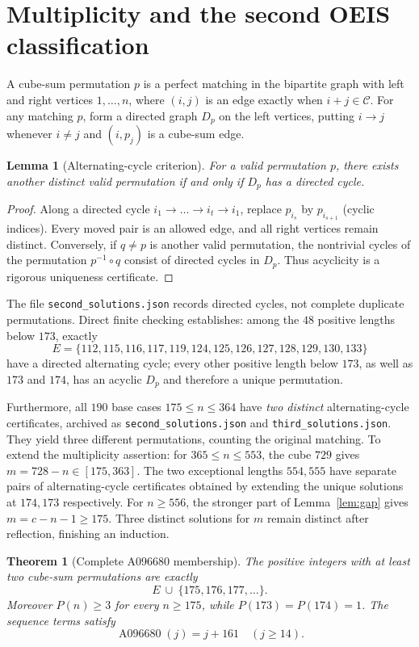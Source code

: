 \documentclass[10pt]{article}
\newtheorem{theorem}{Theorem}
\newtheorem{lemma}{Lemma}
\newcommand{\cubes}{\mathcal{C}}
\begin{document}
\section{Multiplicity and the second OEIS classification}
A cube-sum permutation $p$ is a perfect matching in the
bipartite graph with left and right vertices $1,\dots,n$,
where $(i,j)$ is an edge exactly when $i+j\in\cubes$.
For any matching $p$, form a directed graph $D_p$ on the
left vertices, putting $i\to j$ whenever $i\ne j$
and $(i,p_j)$ is a cube-sum edge.

\begin{lemma}[Alternating-cycle criterion]\label{lem:cycle}
For a valid permutation $p$, there exists another distinct
valid permutation if and only if $D_p$ has a directed cycle.
\end{lemma}
\begin{proof}
Along a directed cycle $i_1\to\dots\to i_t\to i_1$,
replace $p_{i_s}$ by $p_{i_{s+1}}$ (cyclic indices).
Every moved pair is an allowed edge, and all right
vertices remain distinct. Conversely, if $q\ne p$ is
another valid permutation, the nontrivial cycles of
the permutation $p^{-1}\circ q$ consist of directed
cycles in $D_p$. Thus acyclicity is a rigorous
uniqueness certificate.
\end{proof}

The file \texttt{second\_solutions.json} records directed
cycles, not complete duplicate permutations. Direct
finite checking establishes: among the $48$ positive
lengths below $173$, exactly
\[
E=\{112,115,116,117,119,124,125,126,127,128,129,130,133\}
\]
have a directed alternating cycle; every other positive
length below $173$, as well as $173$ and $174$, has
an acyclic $D_p$ and therefore a unique permutation.

Furthermore, all $190$ base cases $175\le n\le364$
have \emph{two distinct} alternating-cycle certificates,
archived as \texttt{second\_solutions.json} and
\texttt{third\_solutions.json}. They yield three different
permutations, counting the original matching.
To extend the multiplicity assertion:
for $365\le n\le553$, the cube $729$ gives
$m=728-n\in[175,363]$. The two exceptional lengths
$554,555$ have separate pairs of alternating-cycle
certificates obtained by extending the unique solutions
at $174,173$ respectively.
For $n\ge556$, the stronger part of
Lemma~\ref{lem:gap} gives
$m=c-n-1\ge175$. Three distinct solutions for $m$
remain distinct after reflection, finishing an induction.

\begin{theorem}[Complete A096680 membership]\label{thm:multi}
The positive integers with at least two cube-sum permutations
are exactly
\[
\boxed{E\ \cup\ \{175,176,177,\dots\}.}
\]
Moreover $P(n)\ge3$ for every $n\ge175$, while
$P(173)=P(174)=1$. The sequence terms
satisfy
\[
\boxed{\operatorname{A096680}(j)=j+161\quad(j\ge14).}
\]
\end{theorem}
\end{document}
